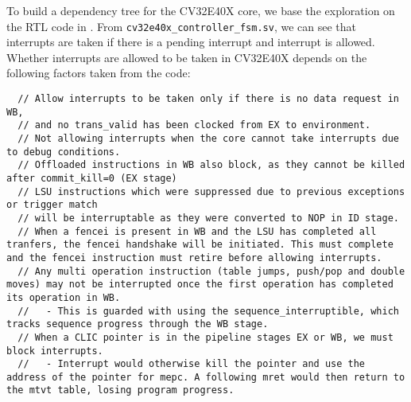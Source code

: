 

To build a dependency tree for the CV32E40X core, we base the exploration on the RTL code in \cite{noauthor_openhw_2023}. From \lstinline{cv32e40x_controller_fsm.sv}, we can see that interrupts are taken if there is a pending interrupt and interrupt is allowed. Whether interrupts are allowed to be taken in CV32E40X depends on the following factors taken from the code:

\pagebreak

\begin{lstlisting}
  // Allow interrupts to be taken only if there is no data request in WB,
  // and no trans_valid has been clocked from EX to environment.
  // Not allowing interrupts when the core cannot take interrupts due to debug conditions.
  // Offloaded instructions in WB also block, as they cannot be killed after commit_kill=0 (EX stage)
  // LSU instructions which were suppressed due to previous exceptions or trigger match
  // will be interruptable as they were converted to NOP in ID stage.
  // When a fencei is present in WB and the LSU has completed all tranfers, the fencei handshake will be initiated. This must complete and the fencei instruction must retire before allowing interrupts.
  // Any multi operation instruction (table jumps, push/pop and double moves) may not be interrupted once the first operation has completed its operation in WB.
  //   - This is guarded with using the sequence_interruptible, which tracks sequence progress through the WB stage.
  // When a CLIC pointer is in the pipeline stages EX or WB, we must block interrupts.
  //   - Interrupt would otherwise kill the pointer and use the address of the pointer for mepc. A following mret would then return to the mtvt table, losing program progress. 
\end{lstlisting}


